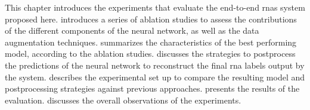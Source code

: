 
This chapter introduces the experiments that evaluate the
end-to-end \glspl{rna} system proposed here.
 introduces a series of ablation
studies to assess the contributions of the different
components of the neural network, as well as the data
augmentation techniques.
 summarizes the
characteristics of the best performing model, according to
the ablation studies.
discusses the strategies to postprocess the predictions of
the neural network to reconstruct the final \gls{rna} labels
output by the system.
 describes the
experimental set up to compare the resulting model and
postprocessing strategies against previous approaches.
 presents the results of the evaluation.
 discusses the overall observations of
the experiments. 
